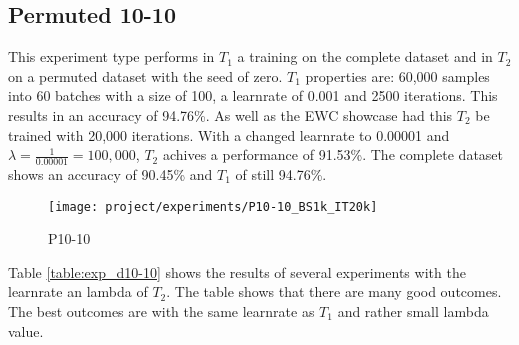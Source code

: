 \newpage

\subsection{Permuted 10-10}

This experiment type performs in $T_1$ a training on the complete dataset and in $T_2$ on a permuted dataset with the seed of zero.
\newline
$T_1$ properties are: 60,000 samples into 60 batches with a size of 100, a learnrate of 0.001 and 2500 iterations.
This results in an accuracy of 94.76\%.
\newline
As well as the EWC showcase had this $T_2$ be trained with 20,000 iterations.
With a changed learnrate to 0.00001 and $\lambda = \frac{1}{0.00001} = 100,000$, $T_2$ achives a performance of 91.53\%.
The complete dataset shows an accuracy of 90.45\% and $T_1$ of still 94.76\%.

\begin{figure}[H]
    \centering
    \texttt{[image: project/experiments/P10-10\_BS1k\_IT20k]}
    \caption{P10-10}
    \label{fig:exp_p10-10}
\end{figure}

\newpage

Table \ref{table:exp_d10-10} shows the results of several experiments with the learnrate an lambda of $T_2$.
The table shows that there are many good outcomes.
The best outcomes are with the same learnrate as $T_1$ and rather small lambda value.

